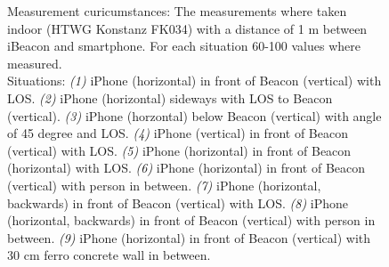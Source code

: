 \begin{figure}
\centering

\caption {Measurement curicumstances: The measurements where taken indoor (HTWG Konstanz FK034) with a distance of 1 m between iBeacon and smartphone. For each situation 60-100 values where measured.\\
  Situations:
  \emph{(1)} iPhone (horizontal) in front of Beacon (vertical) with \acs{LOS}.
  \emph{(2)} iPhone (horizontal) sideways with \acs{LOS} to  Beacon (vertical).
  \emph{(3)} iPhone (horzontal) below Beacon (vertical) with angle of 45 degree and \acs{LOS}.
  \emph{(4)} iPhone (vertical) in front of Beacon (vertical) with \acs{LOS}.
  \emph{(5)} iPhone (horizontal) in front of Beacon (horizontal) with \acs{LOS}.
  \emph{(6)} iPhone (horizontal) in front of Beacon (vertical) with person in between.
  \emph{(7)} iPhone (horizontal, backwards) in front of Beacon (vertical) with \acs{LOS}.
  \emph{(8)} iPhone (horizontal, backwards) in front of Beacon (vertical) with person in between.
  \emph{(9)} iPhone (horizontal) in front of Beacon (vertical) with 30 cm ferro concrete wall in between.
}
\end{figure}

